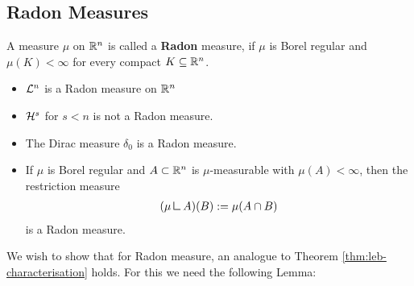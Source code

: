 \subsection{Radon Measures}\label{sec:radon}

\begin{dfn}[]
  A measure $\mu$ on $\mathbb{R}^{n}$ is called a \textbf{Radon} measure, if $\mu$ is Borel regular and $\mu(K) < \infty$ for every compact $K \subseteq \mathbb{R}^{n}$.
\end{dfn}

\begin{ex}[]
\phantom{a}
\begin{itemize}
  \item $\mathcal{L}^{n}$ is a Radon measure on $\mathbb{R}^{n}$
  \item $\mathcal{H}^{s}$ for $s < n$ is not a Radon measure.
  \item The Dirac measure $\delta_0$ is a Radon measure.
  \item If $\mu$ is Borel regular and $A \subset \mathbb{R}^{n}$ is $\mu$-measurable with $\mu(A) < \infty$, then the restriction measure
    \begin{align*}
      (\mu \mres A)(B) := \mu(A \cap B)
    \end{align*}
    is a Radon measure.
\end{itemize}
\end{ex}

We wish to show that for Radon measure, an analogue to Theorem \ref{thm:leb-characterisation} holds.
For this we need the following Lemma:


